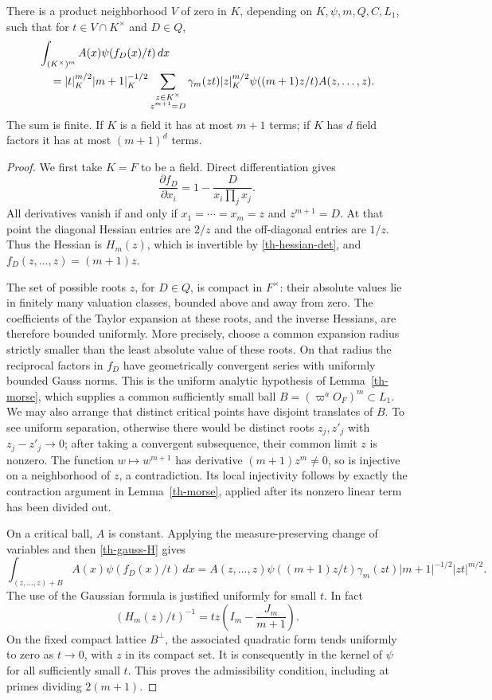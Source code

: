 \begin{theorem}\label{th-stationary}
There is a product neighborhood $V$ of zero in $K$, depending on
$K,\psi,m,Q,C,L_1$, such that for $t\in V\cap K^\times$ and $D\in Q$,
\begin{align}\label{th-stationary-formula}
 &\int_{(K^\times)^m}A(x)\psi(f_D(x)/t)\,dx\notag\\
 &\quad=|t|_K^{m/2}|m+1|_K^{-1/2}
   \sum_{\substack{z\in K^\times\\z^{m+1}=D}}
    \gamma_m(zt)|z|_K^{m/2}
    \psi((m+1)z/t)A(z,\ldots,z).
\end{align}
The sum is finite.  If $K$ is a field it has at most $m+1$ terms;
if $K$ has $d$ field factors it has at most $(m+1)^d$ terms.
\end{theorem}

\begin{proof}
We first take $K=F$ to be a field.  Direct differentiation gives
\[
 \frac{\partial f_D}{\partial x_i}
   =1-\frac{D}{x_i\prod_jx_j}.
\]
All derivatives vanish if and only if $x_1=\cdots=x_m=z$ and
$z^{m+1}=D$.  At that point the diagonal Hessian entries are $2/z$
and the off-diagonal entries are $1/z$.  Thus the Hessian is $H_m(z)$,
which is invertible by \eqref{th-hessian-det}, and
$f_D(z,\ldots,z)=(m+1)z$.

The set of possible roots $z$, for $D\in Q$, is compact in $F^\times$:
their absolute values lie in finitely many valuation classes, bounded
above and away from zero.  The coefficients of the Taylor expansion
at these roots, and the inverse Hessians, are therefore bounded
uniformly.  More precisely, choose a common expansion radius strictly
smaller than the least absolute value of these roots.  On that radius
the reciprocal factors in $f_D$ have geometrically convergent series
with uniformly bounded Gauss norms.  This is the uniform analytic
hypothesis of Lemma~\ref{th-morse}, which supplies a common sufficiently small
ball $B=(\varpi^aO_F)^m\subset L_1$.  We may also arrange that distinct
critical points have disjoint translates of $B$.  To see uniform
separation, otherwise there would be distinct roots $z_j,z'_j$ with
$z_j-z'_j\to0$; after taking a convergent subsequence, their common
limit $z$ is nonzero.  The function $w\mapsto w^{m+1}$ has derivative
$(m+1)z^m\ne0$, so is injective on a neighborhood of $z$, a
contradiction.  Its local injectivity follows by exactly the contraction
argument in Lemma~\ref{th-morse}, applied after its nonzero linear term
has been divided out.

On a critical ball, $A$ is constant.  Applying the measure-preserving
change of variables and then \eqref{th-gauss-H} gives
\[
 \int_{(z,\ldots,z)+B}A(x)\psi(f_D(x)/t)\,dx
 =A(z,\ldots,z)\psi((m+1)z/t)
   \gamma_m(zt)|m+1|^{-1/2}|zt|^{m/2}.
\]
The use of the Gaussian formula is justified uniformly for small $t$.
In fact
\[
 (H_m(z)/t)^{-1}
       =tz\left(I_m-\frac{J_m}{m+1}\right).
\]
On the fixed compact lattice $B^\perp$, the associated quadratic
form tends uniformly to zero as $t\to0$, with $z$ in its compact
set.  It is consequently in the kernel of $\psi$ for all sufficiently
small $t$.  This proves the admissibility condition, including at
primes dividing $2(m+1)$.


\end{proof}
